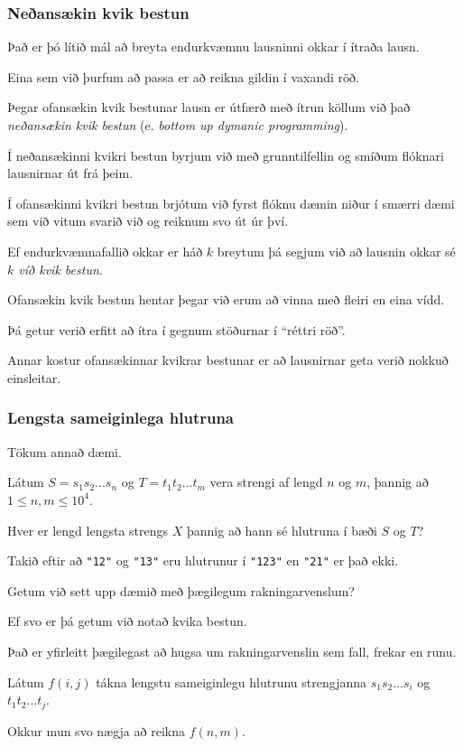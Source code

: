 {
	\frametitle{Neðansækin kvik bestun}
	{
		\item<1-> Það er þó lítið mál að breyta endurkvæmnu lausninni okkar í ítraða lausn.
		\item<2-> Eina sem við þurfum að passa er að reikna gildin í vaxandi röð.
		\item<3->[]
		\item<4-> Þegar ofansækin kvik bestunar lausn er útfærð með ítrun köllum við það \emph{neðansækin kvik bestun} 
					(e. \emph{bottom up dymanic programming}).
	}
}

{
	{
		\item<1-> Í neðansækinni kvikri bestun byrjum við með grunntilfellin og smíðum flóknari lausnirnar út frá þeim.
		\item<2-> Í ofansækinni kvikri bestun brjótum við fyrst flóknu dæmin niður í smærri dæmi sem við vitum svarið við og reiknum svo út úr því.
		\item<3-> Ef endurkvæmnafallið okkar er háð $k$ breytum þá segjum við að lausnin okkar sé \emph{$k$ víð kvik bestun}.
		\item<4-> Ofansækin kvik bestun hentar þegar við erum að vinna með fleiri en eina vídd.
		\item<5-> Þá getur verið erfitt að ítra í gegnum stöðurnar í ``réttri röð''.
	}
}

{
	{
		\item<1-> Annar kostur ofansækinnar kvikrar bestunar er að lausnirnar geta verið nokkuð einsleitar.
		\item<2->[]
	}
}

{
	\frametitle{Lengsta sameiginlega hlutruna}
	{
		\item<1-> Tökum annað dæmi.
		\item<2-> Látum $S = s_1s_2...s_n$ og $T = t_1t_2...t_m$ vera strengi af lengd $n$ og $m$, þannig að $1 \leq n, m \leq 10^4$.
		\item<3-> Hver er lengd lengsta strengs $X$ þannig að hann sé hlutruna í bæði $S$ og $T$?
		\item<4-> Takið eftir að \texttt{"12"} og \texttt{"13"} eru hlutrunur í \texttt{"123"} en \texttt{"21"} er það ekki.
	}
}

{
	{
		\item<1-> Getum við sett upp dæmið með þægilegum rakningarvenslum?
		\item<2-> Ef svo er þá getum við notað kvika bestun.
		\item<3-> Það er yfirleitt þægilegast að hugsa um rakningarvenslin sem fall, frekar en runu.
		\item<4-> Látum $f(i, j)$ tákna lengstu sameiginlegu hlutrunu strengjanna $s_1s_2...s_i$ og $t_1t_2...t_j$.
		\item<5-> Okkur mun svo nægja að reikna $f(n, m)$.
	}
}

